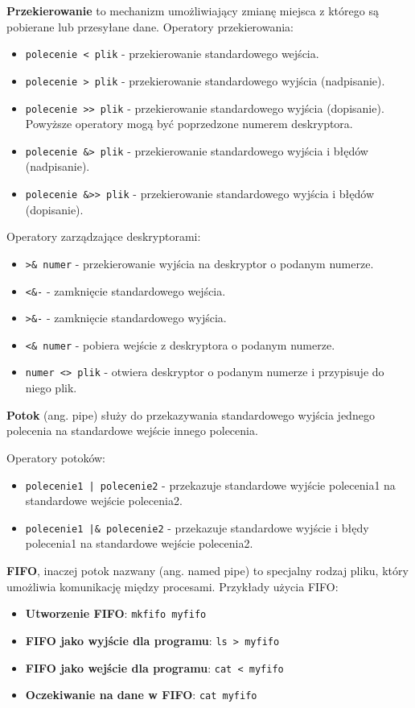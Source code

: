 \documentclass{article}
\begin{document}
\textbf{Przekierowanie} to mechanizm umożliwiający zmianę miejsca z którego
są pobierane lub przesyłane dane.
Operatory przekierowania:
\begin{itemize}
    \item \texttt{polecenie < plik} - przekierowanie standardowego wejścia.
    \item \texttt{polecenie > plik} - przekierowanie standardowego wyjścia (nadpisanie).
    \item \texttt{polecenie >> plik} - przekierowanie standardowego wyjścia (dopisanie).
    Powyższe operatory mogą być poprzedzone numerem deskryptora.
    \item \texttt{polecenie \&> plik} - przekierowanie standardowego wyjścia i błędów (nadpisanie).
    \item \texttt{polecenie \&>> plik} - przekierowanie standardowego wyjścia i błędów (dopisanie).
\end{itemize}
Operatory zarządzające deskryptorami:
\begin{itemize}
    \item \texttt{>\& numer} - przekierowanie wyjścia na deskryptor o podanym numerze.
    \item \texttt{<\&-} - zamknięcie standardowego wejścia.
    \item \texttt{>\&-} - zamknięcie standardowego wyjścia.
    \item \texttt{<\& numer} - pobiera wejście z deskryptora o podanym numerze.
    \item \texttt{numer <> plik} - otwiera deskryptor o podanym numerze i przypisuje do niego plik.
\end{itemize}

\textbf{Potok} (ang. pipe) służy do przekazywania standardowego wyjścia jednego polecenia na standardowe wejście innego polecenia.

Operatory potoków:
\begin{itemize}
    \item{\texttt{polecenie1 | polecenie2}} - przekazuje standardowe wyjście polecenia1 na standardowe wejście polecenia2.
    \item \texttt{polecenie1 |\& polecenie2} - przekazuje standardowe wyjście i błędy polecenia1 na standardowe wejście polecenia2.
\end{itemize}

\textbf{FIFO}, inaczej potok nazwany (ang. named pipe) to specjalny rodzaj pliku, który umożliwia komunikację między procesami.
Przykłady użycia FIFO:
\begin{itemize}
    \item \textbf{Utworzenie FIFO}: \texttt{mkfifo myfifo}
    \item \textbf{FIFO jako wyjście dla programu}: \texttt{ls > myfifo}
    \item \textbf{FIFO jako wejście dla programu}: \texttt{cat < myfifo}
    \item \textbf{Oczekiwanie na dane w FIFO}: \texttt{cat myfifo}
\end{itemize}
\end{document}
